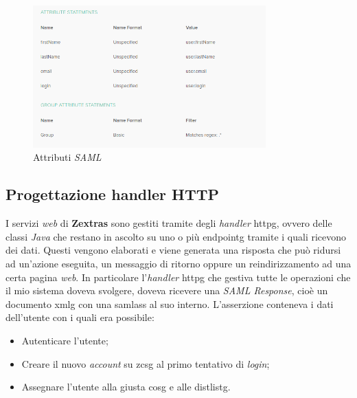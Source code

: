     \begin{figure}[ht]
        \centering
        \includegraphics[width=0.8\textwidth]{immagini/saml_attributes.png}
        \caption{Attributi \textit{SAML}}
        \label{fig: Attributi SAML}
    \end{figure}

\subsection{Progettazione handler HTTP}
I servizi \textit{web} di \textbf{Zextras} sono gestiti tramite degli \textit{handler} \gls{httpg}, ovvero delle classi \textit{Java} che restano in ascolto su uno o più \gls{endpointg} tramite i quali ricevono dei dati. Questi vengono elaborati e viene generata una risposta che può ridursi ad un'azione eseguita, un messaggio di ritorno oppure un reindirizzamento ad una certa pagina \textit{web}. In particolare l'\textit{handler} \gls{httpg} che gestiva tutte le operazioni che il mio sistema doveva svolgere, doveva ricevere una \textit{SAML Response}, cioè un documento \gls{xmlg} con una \gls{samlass} al suo interno. L'asserzione conteneva i dati dell'utente con i quali era possibile:
\begin{itemize}
    \setlength\itemsep{0em}
    \item Autenticare l'utente;
    \item Creare il nuovo \textit{account} su \gls{zcsg} al primo tentativo di \textit{login};
    \item Assegnare l'utente alla giusta \gls{cosg} e alle \gls{distlistg}.
\end{itemize}
